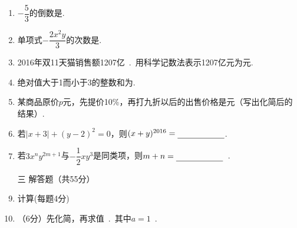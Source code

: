 ﻿\documentclass[11pt,twoside]{ctexart}
\begin{document}
\begin{enumerate}
\item $-\dfrac{5}{3}$的倒数是.
\item 单项式$-\dfrac{2x^2y}{3}$的次数是.
\item 2016年双11天猫销售额1207亿~.~用科学记数法表示1207亿元为元.

\item 绝对值大于1而小于3的整数和为.

\item 某商品原价$p$元，先提价10\%，再打九折以后的出售价格是元（写出化简后的结果）.
\item 若$|x+3|+(y-2)^2=0$，则$(x+y)^{2016}=\line{2}$.
\item 若$3x^ny^{2m+1}$与$-\dfrac{1}{2}xy^3$是同类项，则$m+n=\line{2}$~.


\item[\kaishu{}三]{\kaishu{}\dafenlan{}解答题（共55分）}%
\item {\kaishu{}计算(每题4分)}\par
{}
\vfill
{}
\vfill
\newpage
%
%
\item （6分）先化简，再求值~.~其中$a=1$~.\\
\vfill


\end{enumerate}
\end{document}
